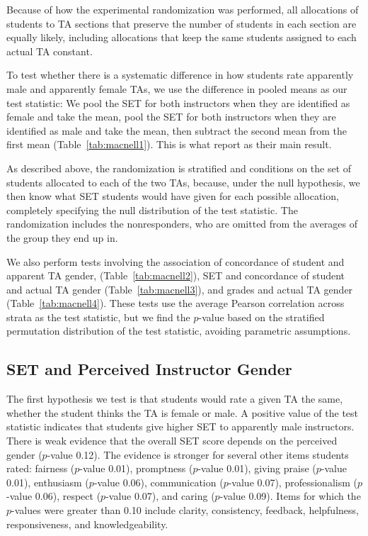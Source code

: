 \documentclass[12pt]{article}
\newcommand{\todo}[1]{{\color{red}{TO DO: \sc #1}}}
\begin{document}
Because of how the experimental randomization was performed, all allocations of students to 
TA sections that preserve the number of students in each section are equally likely,  
including allocations that keep the same students assigned to each actual TA constant.

To test whether there is a systematic difference in how students rate apparently male and 
apparently female TAs, we use the difference in pooled means as our test statistic:
We pool the SET for both instructors when they are identified as female
and take the mean, pool the SET for both instructors when they are identified as male
and take the mean, then subtract the second mean from the first mean
(Table~\ref{tab:macnell1}).
This is what \cite{MacNell2014} report as their main result.

As described above, the randomization is stratified and conditions on the set of students 
allocated to each of the two TAs, because, under the null hypothesis, we then know what 
SET students would have given for each possible allocation, completely specifying the
null distribution of the test statistic.
The randomization includes the nonresponders, who are omitted from the averages of the
group they end up in.

We also perform tests involving the association of concordance of student and apparent 
TA gender,
(Table~\ref{tab:macnell2}), SET and concordance of student and actual TA gender 
(Table~\ref{tab:macnell3}), and grades and actual TA gender (Table~\ref{tab:macnell4}).  
These tests use the average Pearson correlation across strata as the test statistic, 
but we find the $p$-value
based on the stratified permutation distribution of the test statistic, avoiding
parametric assumptions.

\subsection{SET and Perceived Instructor Gender}
\todo{make sure the category names make sense in the prose}
The first hypothesis we test is that students would rate a given TA the same,
whether the student thinks the TA is female or male. 
A positive value of the test statistic indicates that students give higher SET
to apparently male instructors.
There is weak evidence that the overall SET score depends on the perceived gender ($p$-value 0.12). 
The evidence is stronger for several other items students rated: fairness ($p$-value 0.01), 
promptness ($p$-value 0.01), giving praise ($p$-value 0.01), 
enthusiasm ($p$-value 0.06), communication ($p$-value 0.07), professionalism ($p$-value 0.06), respect ($p$-value 0.07), and caring ($p$-value 0.09). 
Items for which the $p$-values were greater than 0.10 include clarity,
consistency, feedback, helpfulness, responsiveness, and knowledgeability.
\end{document}
